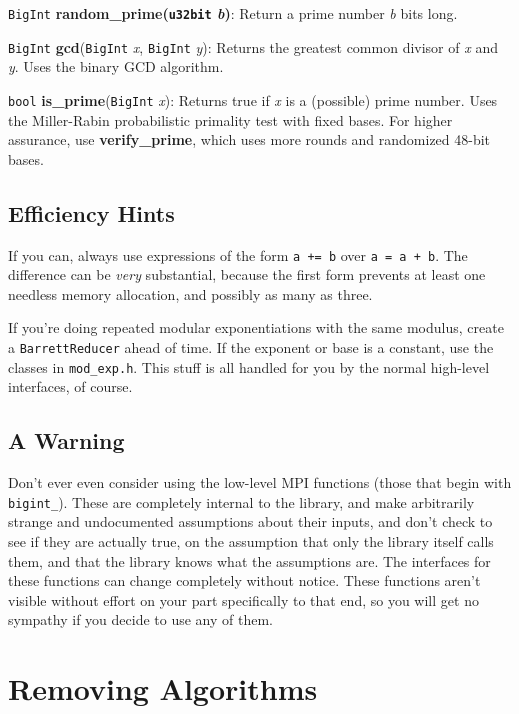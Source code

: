 \documentclass{article}
\newcommand{\filename}[1]{\texttt{#1}}
\newcommand{\function}[1]{\textbf{#1}}
\newcommand{\type}[1]{\texttt{#1}}
\renewcommand{\arg}[1]{\textsl{#1}}
\begin{document}
\type{BigInt} \function{random\_prime(\type{u32bit} \arg{b})}: Return a prime
number \arg{b} bits long.

\type{BigInt} \function{gcd}(\type{BigInt} \arg{x}, \type{BigInt} \arg{y}):
Returns the greatest common divisor of \arg{x} and \arg{y}. Uses the binary
GCD algorithm.

\type{bool} \function{is\_prime}(\type{BigInt} \arg{x}): Returns true if
\arg{x} is a (possible) prime number. Uses the Miller-Rabin probabilistic
primality test with fixed bases. For higher assurance, use
\function{verify\_prime}, which uses more rounds and randomized 48-bit bases.

\subsection{Efficiency Hints}

If you can, always use expressions of the form \verb|a += b| over
\verb|a = a + b|. The difference can be \emph{very} substantial, because the
first form prevents at least one needless memory allocation, and possibly as
many as three.

If you're doing repeated modular exponentiations with the same modulus, create
a \type{BarrettReducer} ahead of time. If the exponent or base is a constant,
use the classes in \filename{mod\_exp.h}. This stuff is all handled for you by
the normal high-level interfaces, of course.

\subsection{A Warning}

Don't ever even consider using the low-level MPI functions (those that begin
with \texttt{bigint\_}). These are completely internal to the library, and make
arbitrarily strange and undocumented assumptions about their inputs, and don't
check to see if they are actually true, on the assumption that only the library
itself calls them, and that the library knows what the assumptions are. The
interfaces for these functions can change completely without notice. These
functions aren't visible without effort on your part specifically to that end,
so you will get no sympathy if you decide to use any of them.

\pagebreak

\section{Removing Algorithms}
\end{document}
